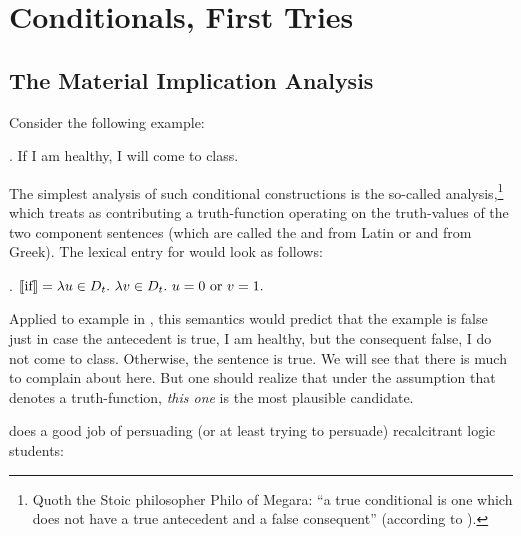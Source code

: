 \chapter{Conditionals, First Tries}\label{cha:conditionals-first} %


\minitoc

\section{The Material Implication Analysis}

Consider the following example:

\ex. If I am healthy, I will come to class.

The simplest analysis of such conditional constructions is the so-called  analysis,\footnote{Quoth the Stoic philosopher Philo of Megara: ``a true conditional is one which does not have a true antecedent and a false consequent'' (according to \citet[II, 110--112]{sextus-empiricus:200:outlines}).} which treats  as contributing a truth-function operating on the truth-values of the two component sentences (which are called the  and  \dash from Latin \dash or  and  \dash from Greek). The lexical entry for  would look as follows:

\ex.\label{ex:material} $\llbracket \mbox{if} \rrbracket = \lambda u \in D_t.\ \lambda v \in D_t.\ u=0 \mbox{ or } v=1.$

Applied to example in \LLast, this semantics would predict that the example is false just in case the antecedent is true, I am healthy, but the consequent false, I do not come to class. Otherwise, the sentence is true. We will see that there is much to complain about here. But one should realize that under the assumption that  denotes a truth-function, \emph{this one} is the most plausible candidate.

\citet{suber:1997:material} does a good job of persuading (or at least trying to persuade) recalcitrant logic students:


